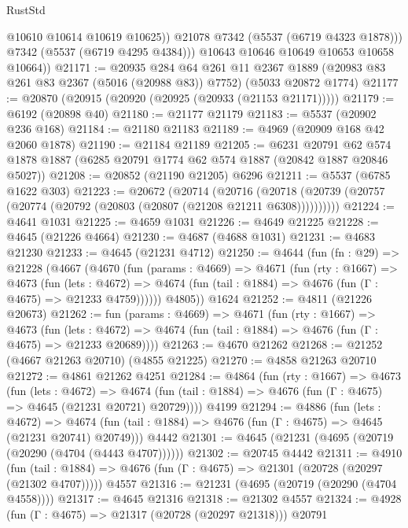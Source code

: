 \begin{lexlean}{RustStd}
\begin{coremodule}
                @10610
                @10614
                @10619
                @10625))
            @21078
            @7342
            (@5537 (@6719 @4323 @1878)))
          @7342
          (@5537 (@6719 @4295 @4384)))
        @10643
        @10646
        @10649
        @10653
        @10658
        @10664))
@21171 := @20935
    @284
    @64
    @261
    @11
    @2367
    @1889
    (@20983 @83 @261 @83 @2367 (@5016 (@20988 @83)) @7752)
    (@5033 @20872 @1774)
@21177 := @20870 (@20915 (@20920 (@20925 (@20933 (@21153 @21171)))))
@21179 := @6192 (@20898 @40)
@21180 := @21177 @21179
@21183 := @5537 (@20902 @236 @168)
@21184 := @21180 @21183
@21189 := @4969 (@20909 @168 @42 @2060 @1878)
@21190 := @21184 @21189
@21205 := @6231
    @20791
    @62
    @574
    @1878
    @1887
    (@6285 @20791 @1774 @62 @574 @1887 (@20842 @1887 @20846 @5027))
@21208 := @20852 (@21190 @21205) @6296
@21211 := @5537 (@6785 @1622 @303)
@21223 := @20672
    (@20714
      (@20716 (@20718 (@20739 (@20757 (@20774 (@20792 (@20803 (@20807 (@21208 @21211 @6308))))))))))
@21224 := @4641 @1031
@21225 := @4659 @1031
@21226 := @4649 @21225
@21228 := @4645 (@21226 @4664)
@21230 := @4687 (@4688 @1031)
@21231 := @4683 @21230
@21233 := @4645 (@21231 @4712)
@21250 := @4644
    (fun (fn : @29) =>
    @21228
      (@4667
        (@4670
          (fun (params : @4669) =>
          @4671
            (fun (rty : @1667) =>
            @4673
              (fun (lets : @4672) =>
              @4674 (fun (tail : @1884) => @4676 (fun (Γ : @4675) => @21233 @4759))))))
        @4805))
    @1624
@21252 := @4811 (@21226 @20673)
@21262 := fun (params : @4669) =>
  @4671
    (fun (rty : @1667) =>
    @4673
      (fun (lets : @4672) =>
      @4674 (fun (tail : @1884) => @4676 (fun (Γ : @4675) => @21233 @20689))))
@21263 := @4670 @21262
@21268 := @21252 (@4667 @21263 @20710) (@4855 @21225)
@21270 := @4858 @21263 @20710
@21272 := @4861 @21262 @4251
@21284 := @4864
    (fun (rty : @1667) =>
    @4673
      (fun (lets : @4672) =>
      @4674 (fun (tail : @1884) => @4676 (fun (Γ : @4675) => @4645 (@21231 @20721) @20729))))
    @4199
@21294 := @4886
    (fun (lets : @4672) =>
    @4674 (fun (tail : @1884) => @4676 (fun (Γ : @4675) => @4645 (@21231 @20741) @20749)))
    @4442
@21301 := @4645 (@21231 (@4695 (@20719 (@20290 (@4704 (@4443 @4707))))))
@21302 := @20745 @4442
@21311 := @4910
    (fun (tail : @1884) => @4676 (fun (Γ : @4675) => @21301 (@20728 (@20297 (@21302 @4707)))))
    @4557
@21316 := @21231 (@4695 (@20719 (@20290 (@4704 @4558))))
@21317 := @4645 @21316
@21318 := @21302 @4557
@21324 := @4928 (fun (Γ : @4675) => @21317 (@20728 (@20297 @21318))) @20791

\end{coremodule}
\end{lexlean}
